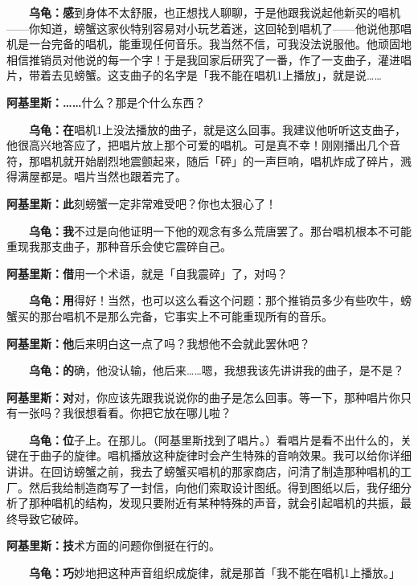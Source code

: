 \documentclass[
  12pt,
  twoside,
  openright,
  oldfontcommands,
]{memoir}
\newcommand{\kaitismall}[1]{{\kaitifamily\small #1}}
\newcommand{\heititext}[1]{{\heifamily\bfseries #1}}
\newcommand{\dialogname}[1]{{\heifamily\bfseries #1}}
\begin{document}
\dialogname{　　乌龟：}\heititext{感}到身体不太舒服，也正想找人聊聊，于是他跟我说起他新买的唱机------你知道，螃蟹这家伙特别容易对小玩艺着迷，这回轮到唱机了------他说他那唱机是一台完备的唱机，能重现任何音乐。我当然不信，可我没法说服他。他顽固地相信推销员对他说的每一个字！于是我回家后研究了一番，作了一支曲子，灌进唱片，带着去见螃蟹。这支曲子的名字是「我不能在唱机1上播放」，就是说\ldots\ldots{}

\dialogname{阿基里斯：}\heititext{\ldots\ldots{}}什么？那是个什么东西？

\dialogname{　　乌龟：}\heititext{在}唱机1上没法播放的曲子，就是这么回事。我建议他听听这支曲子，他很高兴地答应了，把唱片放上那个可爱的唱机。可是真不幸！刚刚播出几个音符，那唱机就开始剧烈地震颤起来，随后「砰」的一声巨响，唱机炸成了碎片，溅得满屋都是。唱片当然也跟着完了。

\dialogname{阿基里斯：}\heititext{此}刻螃蟹一定非常难受吧？你也太狠心了！

\dialogname{　　乌龟：}\heititext{我}不过是向他证明一下他的观念有多么荒唐罢了。那台唱机根本不可能重现我那支曲子，那种音乐会使它震碎自己。

\dialogname{阿基里斯：}\heititext{借}用一个术语，就是「自我震碎」了，对吗？

\dialogname{　　乌龟：}\heititext{用}得好！当然，也可以这么看这个问题：那个推销员多少有些吹牛，螃蟹买的那台唱机不是那么完备，它事实上不可能重现所有的音乐。

\dialogname{阿基里斯：}\heititext{他}后来明白这一点了吗？我想他不会就此罢休吧？

\dialogname{　　乌龟：}\heititext{的}确，他没认输，他后来\ldots\ldots 嗯，我想我该先讲讲我的曲子，是不是？

\dialogname{阿基里斯：}\heititext{对}对，你应该先跟我说说你的曲子是怎么回事。等一下，那种唱片你只有一张吗？我很想看看。你把它放在哪儿啦？

\dialogname{　　乌龟：}\heititext{位}子上。在那儿。\kaitismall{（阿基里斯找到了唱片。）}看唱片是看不出什么的，关键在于曲子的旋律。唱机播放这种旋律时会产生特殊的音响效果。我可以给你详细讲讲。在回访螃蟹之前，我去了螃蟹买唱机的那家商店，问清了制造那种唱机的工厂。然后我给制造商写了一封信，向他们索取设计图纸。得到图纸以后，我仔细分析了那种唱机的结构，发现只要附近有某种特殊的声音，就会引起唱机的共振，最终导致它破碎。

\dialogname{阿基里斯：}\heititext{技}术方面的问题你倒挺在行的。

\dialogname{　　乌龟：}\heititext{巧}妙地把这种声音组织成旋律，就是那首「我不能在唱机1上播放。」
\end{document}

